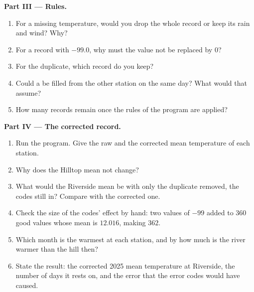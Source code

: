 \begin{problem}
\medskip\noindent\textbf{Part III --- Rules.}
\begin{enumerate}[resume]
  \item For a missing temperature, would you drop the whole record or keep its rain and wind? Why?
  \item For a record with $-99.0$, why must the value not be replaced by $0$?
  \item For the duplicate, which record do you keep?
  \item Could a  be filled from the other station on the same day? What would that assume?
  \item How many records remain once the rules of the program are applied?
\end{enumerate}

\medskip\noindent\textbf{Part IV --- The corrected record.}
\begin{enumerate}[resume]
  \item Run the program. Give the raw and the corrected mean temperature of each station.
  \item Why does the Hilltop mean not change?
  \item What would the Riverside mean be with only the duplicate removed, the codes still in? Compare with the
    corrected one.
  \item Check the size of the codes' effect by hand: two values of $-99$ added to $360$ good values whose mean is
    $12.016$, making $362$.
  \item Which month is the warmest at each station, and by how much is the river warmer than the hill then?
  \item State the result: the corrected 2025 mean temperature at Riverside, the number of days it rests on, and the
    error that the error codes would have caused.
\end{enumerate}
\end{problem}
